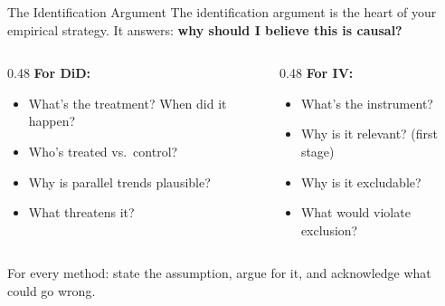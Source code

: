 \begin{frame}{The Identification Argument}
  The identification argument is the heart of your empirical strategy. It answers: \textbf{why should I believe this is causal?}

  \vspace{6pt}

  \begin{columns}[T]
    \begin{column}{0.48\textwidth}
      \textbf{\textcolor{usfgreen}{For DiD:}}
      \begin{itemize}
        \item What's the treatment? When did it happen?
        \item Who's treated vs.\ control?
        \item Why is parallel trends plausible?
        \item What threatens it?
      \end{itemize}
    \end{column}
    \begin{column}{0.48\textwidth}
      \textbf{\textcolor{usfgreen}{For IV:}}
      \begin{itemize}
        \item What's the instrument?
        \item Why is it relevant? (first stage)
        \item Why is it excludable?
        \item What would violate exclusion?
      \end{itemize}
    \end{column}
  \end{columns}

  \vspace{8pt}

  For every method: state the assumption, argue for it, and acknowledge what could go wrong.
\end{frame}

